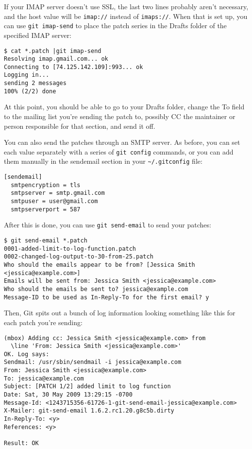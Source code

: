 \documentclass[a4paper]{book}
\begin{document}
If your IMAP server doesn't use SSL, the last two lines probably aren't necessary, and the host value will be \texttt{imap://} instead of \texttt{imaps://}. When that is set up, you can use \texttt{git imap-send} to place the patch series in the Drafts folder of the specified IMAP server:

\begin{shaded}\begin{verbatim}
$ cat *.patch |git imap-send
Resolving imap.gmail.com... ok
Connecting to [74.125.142.109]:993... ok
Logging in...
sending 2 messages
100% (2/2) done
\end{verbatim}\end{shaded}

At this point, you should be able to go to your Drafts folder, change the To field to the mailing list you're sending the patch to, possibly CC the maintainer or person responsible for that section, and send it off.

You can also send the patches through an SMTP server. As before, you can set each value separately with a series of \texttt{git config} commands, or you can add them manually in the sendemail section in your \texttt{\textasciitilde{}/.gitconfig} file:

\begin{shaded}\begin{verbatim}
[sendemail]
  smtpencryption = tls
  smtpserver = smtp.gmail.com
  smtpuser = user@gmail.com
  smtpserverport = 587
\end{verbatim}\end{shaded}

After this is done, you can use \texttt{git send-email} to send your patches:

\begin{shaded}\begin{verbatim}
$ git send-email *.patch
0001-added-limit-to-log-function.patch
0002-changed-log-output-to-30-from-25.patch
Who should the emails appear to be from? [Jessica Smith <jessica@example.com>]
Emails will be sent from: Jessica Smith <jessica@example.com>
Who should the emails be sent to? jessica@example.com
Message-ID to be used as In-Reply-To for the first email? y
\end{verbatim}\end{shaded}

Then, Git spits out a bunch of log information looking something like this for each patch you're sending:

\begin{shaded}\begin{verbatim}
(mbox) Adding cc: Jessica Smith <jessica@example.com> from
  \line 'From: Jessica Smith <jessica@example.com>'
OK. Log says:
Sendmail: /usr/sbin/sendmail -i jessica@example.com
From: Jessica Smith <jessica@example.com>
To: jessica@example.com
Subject: [PATCH 1/2] added limit to log function
Date: Sat, 30 May 2009 13:29:15 -0700
Message-Id: <1243715356-61726-1-git-send-email-jessica@example.com>
X-Mailer: git-send-email 1.6.2.rc1.20.g8c5b.dirty
In-Reply-To: <y>
References: <y>

Result: OK
\end{verbatim}\end{shaded}
\end{document}
